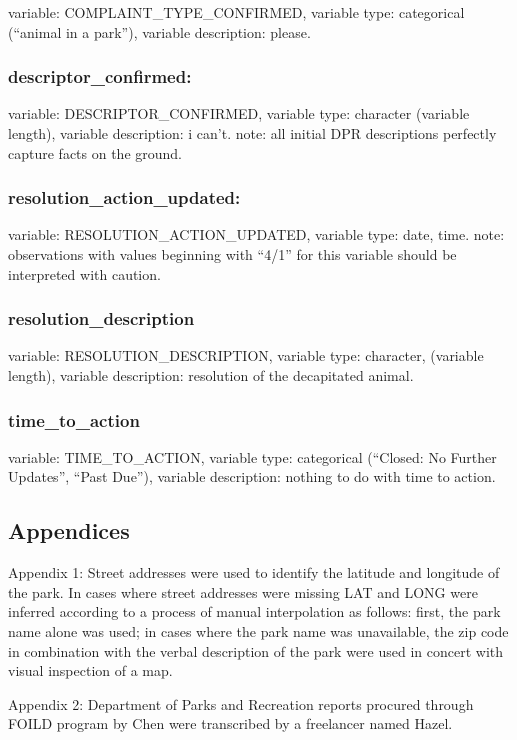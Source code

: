 \documentclass[]{article}
\begin{document}
variable: COMPLAINT\_TYPE\_CONFIRMED, variable type: categorical
(``animal in a park''), variable description: please.

\subsubsection{descriptor\_confirmed:}\label{descriptorux5fconfirmed}

variable: DESCRIPTOR\_CONFIRMED, variable type: character (variable
length), variable description: i can't. note: all initial DPR
descriptions perfectly capture facts on the ground.

\subsubsection{resolution\_action\_updated:}\label{resolutionux5factionux5fupdated}

variable: RESOLUTION\_ACTION\_UPDATED, variable type: date, time. note:
observations with values beginning with ``4/1'' for this variable should
be interpreted with caution.

\subsubsection{resolution\_description}\label{resolutionux5fdescription}

variable: RESOLUTION\_DESCRIPTION, variable type: character, (variable
length), variable description: resolution of the decapitated animal.

\subsubsection{time\_to\_action}\label{timeux5ftoux5faction}

variable: TIME\_TO\_ACTION, variable type: categorical (``Closed: No
Further Updates'', ``Past Due''), variable description: nothing to do
with time to action.

\subsection{Appendices}\label{appendices}

Appendix 1: Street addresses were used to identify the latitude and
longitude of the park. In cases where street addresses were missing LAT
and LONG were inferred according to a process of manual interpolation as
follows: first, the park name alone was used; in cases where the park
name was unavailable, the zip code in combination with the verbal
description of the park were used in concert with visual inspection of a
map.

Appendix 2: Department of Parks and Recreation reports procured through
FOILD program by Chen were transcribed by a freelancer named Hazel.
\end{document}
